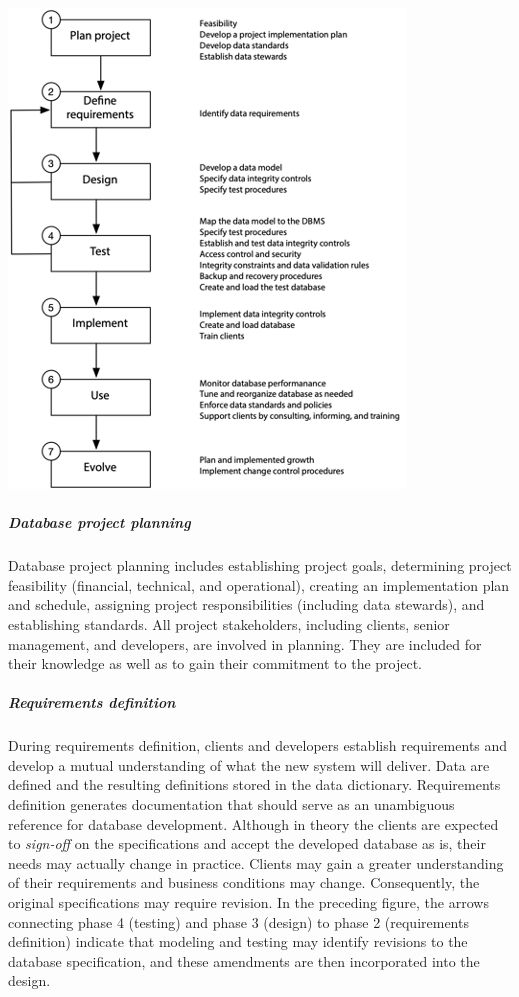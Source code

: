 \documentclass[
]{article}
\begin{document}
\includegraphics{Figures/Chapter 24/DDLC.png}

\hypertarget{database-project-planning}{%
\subparagraph*{Database project planning}\label{database-project-planning}}

Database project planning includes establishing project goals,
determining project feasibility (financial, technical, and operational),
creating an implementation plan and schedule, assigning project
responsibilities (including data stewards), and establishing standards.
All project stakeholders, including clients, senior management, and
developers, are involved in planning. They are included for their
knowledge as well as to gain their commitment to the project.

\hypertarget{requirements-definition}{%
\subparagraph*{Requirements definition}\label{requirements-definition}}

During requirements definition, clients and developers establish
requirements and develop a mutual understanding of what the new system
will deliver. Data are defined and the resulting definitions stored in
the data dictionary. Requirements definition generates documentation
that should serve as an unambiguous reference for database development.
Although in theory the clients are expected to \emph{sign-off} on the
specifications and accept the developed database as is, their needs may
actually change in practice. Clients may gain a greater understanding of
their requirements and business conditions may change. Consequently, the
original specifications may require revision. In the preceding figure,
the arrows connecting phase 4 (testing) and phase 3 (design) to phase 2
(requirements definition) indicate that modeling and testing may
identify revisions to the database specification, and these amendments
are then incorporated into the design.
\end{document}
